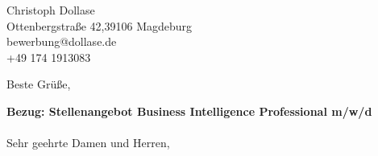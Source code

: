 


%



\clearpage
Christoph Dollase \\
Ottenbergstraße 42,39106 Magdeburg\\
bewerbung@dollase.de \\
+49 174 1913083

\vspace{0,5cm}
\date{\today} %
\opening{} %
\closing{Beste Gr\"u\ss e,} %

\makelettertitle %

\textbf{Bezug: Stellenangebot Business Intelligence Professional m/w/d}\\
\vspace{0,5cm}\\
Sehr geehrte Damen und Herren, \\ \vspace{0.5cm}


